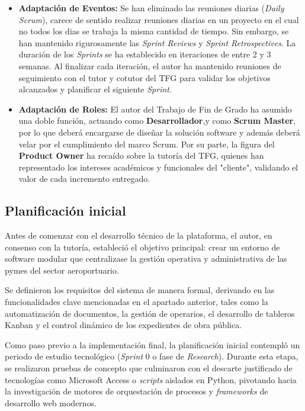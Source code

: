 \begin{itemize}
    \item \textbf{Adaptación de Eventos:} Se han eliminado las reuniones diarias (\textit{Daily Scrum}), carece de sentido realizar reuniones diarias en un proyecto en el cual no todos los dias se trabaja la misma cantidad de tiempo. Sin embargo, se han mantenido rigurosamente las \textit{Sprint Reviews} y \textit{Sprint Retrospectives}. La duración de los \textit{Sprints} se ha establecido en iteraciones de entre 2 y 3 semanas. Al finalizar cada iteración, el autor ha mantenido reuniones de seguimiento con el tutor y cotutor del TFG para validar los objetivos alcanzados y planificar el siguiente \textit{Sprint}.
    \item \textbf{Adaptación de Roles:} El autor del Trabajo de Fin de Grado ha asumido una doble función, actuando como \textbf{Desarrollador},y como \textbf{Scrum Master}, por lo que deberá encargarse de diseñar la solución software y además deberá velar por el cumplimiento del marco Scrum. Por su parte, la figura del \textbf{Product Owner} ha recaído sobre la tutoría del TFG, quienes han representado los intereses académicos y funcionales del "cliente", validando el valor de cada incremento entregado.
\end{itemize}

\subsection{Planificación inicial} 
Antes de comenzar con el desarrollo técnico de la plataforma, el autor, en consenso con la tutoría, estableció el objetivo principal: crear un entorno de software modular que centralizase la gestión operativa y administrativa de las pymes del sector aeroportuario.

Se definieron los requisitos del sistema de manera formal, derivando en las funcionalidades clave mencionadas en el apartado anterior, tales como la automatización de documentos, la gestión de operarios, el desarrollo de tableros Kanban y el control dinámico de los expedientes de obra pública.

Como paso previo a la implementación final, la planificación inicial contempló un periodo de estudio tecnológico (\textit{Sprint} 0 o fase de \textit{Research}). Durante esta etapa, se realizaron pruebas de concepto que culminaron con el descarte justificado de tecnologías como Microsoft Access o \textit{scripts} aislados en Python, pivotando hacia la investigación de motores de orquestación de procesos y \textit{frameworks} de desarrollo web modernos.

